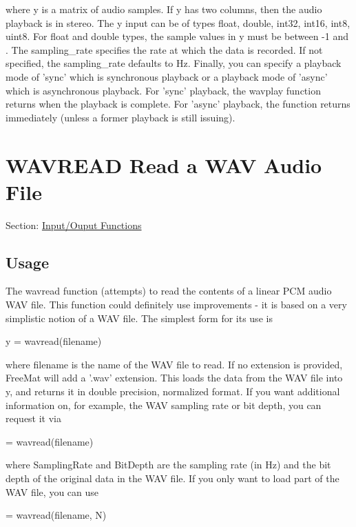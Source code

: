  where {\ttfamily y} is a matrix of audio samples. If {\ttfamily y} has two columns, then the audio playback is in stereo. The {\ttfamily y} input can be of types {\ttfamily float, double, int32, int16, int8, uint8}. For {\ttfamily float} and {\ttfamily double} types, the sample values in {\ttfamily y} must be between {\ttfamily -\/1} and {}. The {\ttfamily sampling\-\_\-rate} specifies the rate at which the data is recorded. If not specified, the {\ttfamily sampling\-\_\-rate} defaults to {\-Hz}. Finally, you can specify a playback mode of {\ttfamily 'sync'} which is synchronous playback or a playback mode of {\ttfamily 'async'} which is asynchronous playback. For {\ttfamily 'sync'} playback, the wavplay function returns when the playback is complete. For {\ttfamily 'async'} playback, the function returns immediately (unless a former playback is still issuing). \hypertarget{io_wavread}{}\section{W\-A\-V\-R\-E\-A\-D Read a W\-A\-V Audio File}\label{io_wavread}
Section\-: \hyperlink{sec_io}{Input/\-Ouput Functions} \hypertarget{vtkwidgets_vtkxyplotwidget_Usage}{}\subsection{Usage}\label{vtkwidgets_vtkxyplotwidget_Usage}
The {\ttfamily wavread} function (attempts) to read the contents of a linear P\-C\-M audio W\-A\-V file. This function could definitely use improvements -\/ it is based on a very simplistic notion of a W\-A\-V file. The simplest form for its use is \begin{DoxyVerb}   y = wavread(filename)
\end{DoxyVerb}
 where {\ttfamily filename} is the name of the W\-A\-V file to read. If no extension is provided, Free\-Mat will add a '.wav' extension. This loads the data from the W\-A\-V file into {\ttfamily y}, and returns it in {\ttfamily double} precision, normalized format. If you want additional information on, for example, the W\-A\-V sampling rate or bit depth, you can request it via \begin{DoxyVerb}   = wavread(filename)
\end{DoxyVerb}
 where {\ttfamily Sampling\-Rate} and {\ttfamily Bit\-Depth} are the sampling rate (in Hz) and the bit depth of the original data in the W\-A\-V file. If you only want to load part of the W\-A\-V file, you can use \begin{DoxyVerb}  [...] = wavread(filename, N)
\end{DoxyVerb}
